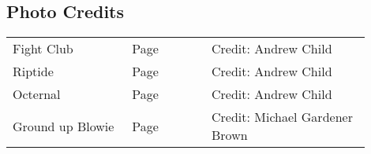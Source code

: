 \begin{flushleft}
\section{Photo Credits}
\begin{supertabular}{p{0.3\linewidth}p{0.2\linewidth}p{0.4\linewidth}}
Fight Club&Page \pageref{pt:Fight Club}&Credit: Andrew Child\\
Riptide&Page \pageref{pt:Riptide}&Credit: Andrew Child\\
Octernal&Page \pageref{pt:Octernal}&Credit: Andrew Child\\
Ground up Blowie&Page \pageref{pt:Ground up Blowie}&Credit: Michael Gardener Brown\\
\end{supertabular}
\end{flushleft}
\onecolumn
\clearpage